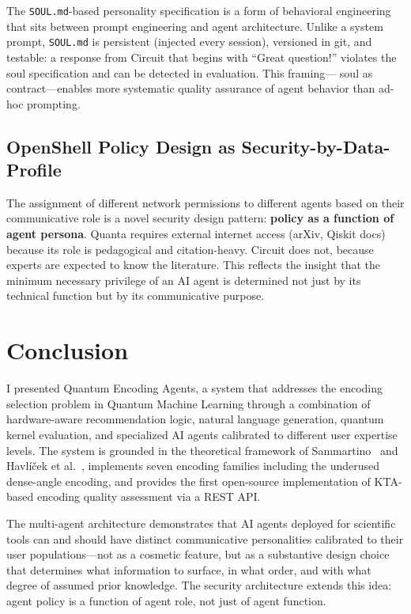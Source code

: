 \documentclass[sigconf,nonacm]{acmart}
\begin{document}
The \texttt{SOUL.md}-based personality specification is a form of behavioral
engineering that sits between prompt engineering and agent architecture. Unlike a
system prompt, \texttt{SOUL.md} is persistent (injected every session), versioned
in git, and testable: a response from Circuit that begins with ``Great question!''
violates the soul specification and can be detected in evaluation. This framing---
soul as contract---enables more systematic quality assurance of agent behavior than
ad-hoc prompting.

\subsection{OpenShell Policy Design as Security-by-Data-Profile}

The assignment of different network permissions to different agents based on their
communicative role is a novel security design pattern: \textbf{policy as a function
of agent persona}. Quanta requires external internet access (arXiv, Qiskit docs)
because its role is pedagogical and citation-heavy. Circuit does not, because
experts are expected to know the literature. This reflects the insight that the
minimum necessary privilege of an AI agent is determined not just by its technical
function but by its communicative purpose.

\section{Conclusion}

I presented Quantum Encoding Agents, a system that addresses the encoding selection
problem in Quantum Machine Learning through a combination of hardware-aware
recommendation logic, natural language generation, quantum kernel evaluation, and
specialized AI agents calibrated to different user expertise levels. The system is
grounded in the theoretical framework of Sammartino~\cite{sammartino2026} and
Havl\'i\v{c}ek et al.~\cite{havlicek2019}, implements seven encoding families
including the underused dense-angle encoding, and provides the first open-source
implementation of KTA-based encoding quality assessment via a REST API.

The multi-agent architecture demonstrates that AI agents deployed for scientific
tools can and should have distinct communicative personalities calibrated to their
user populations---not as a cosmetic feature, but as a substantive design choice
that determines what information to surface, in what order, and with what degree of
assumed prior knowledge. The security architecture extends this idea: agent policy
is a function of agent role, not just of agent function.
\end{document}

